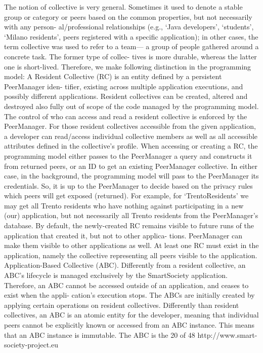 The notion of collective is very general. Sometimes it used to denote a stable group or category or peers based on the common properties, but not necessarily with any person- al/professional relationships (e.g., ‘Java developers’, ‘students’, ‘Milano residents’, peers registered with a specific application); in other cases, the term collective was used to refer to a team— a group of people gathered around a concrete task. The former type of collec- tives is more durable, whereas the latter one is short-lived. Therefore, we make following distinction in the programming model:
A Resident Collective (RC) is an entity defined by a persistent PeerManager iden- tifier, existing across multiple application executions, and possibly different applications. Resident collectives can be created, altered and destroyed also fully out of scope of the code managed by the programming model. The control of who can access and read a resident collective is enforced by the PeerManager. For those resident collectives accessible from the given application, a developer can read/access individual collective members as well as all accessible attributes defined in the collective’s profile. When accessing or creating a RC, the programming model either passes to the PeerManager a query and constructs it from returned peers, or an ID to get an existing PeerManager collective. In either case, in the background, the programming model will pass to the PeerManager its credentials. So, it is up to the PeerManager to decide based on the privacy rules which peers will get exposed (returned). For example, for ‘TrentoResidents’ we may get all Trento residents who have nothing against participating in a new (our) application, but not necessarily all Trento residents from the PeerManager’s database. By default, the newly-created RC remains visible to future runs of the application that created it, but not to other applica- tions. PeerManager can make them visible to other applications as well. At least one RC must exist in the application, namely the collective representing all peers visible to the application.
Application-Based Collective (ABC). Differently from a resident collective, an ABC’s lifecycle is managed exclusively by the SmartSociety application. Therefore, an ABC cannot be accessed outside of an application, and ceases to exist when the appli- cation’s execution stops. The ABCs are initially created by applying certain operations on resident collectives. Differently than resident collectives, an ABC is an atomic entity for the developer, meaning that individual peers cannot be explicitly known or accessed from an ABC instance. This means that an ABC instance is immutable. The ABC is the
20 of 48 http://www.smart-society-project.eu
 
